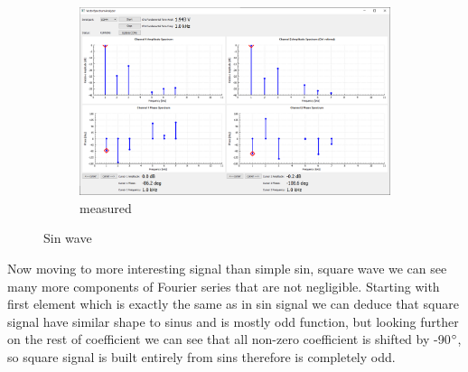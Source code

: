 \documentclass[notitlepage, a4paper, 11pt]{article}
\begin{document}
\begin{figure}[H]
\begin{subfigure}[][][t]{0.3\textwidth}
			\includegraphics[width=\textwidth, trim=10 80 555 100, clip]{../img/Circuit1/sin}
			\caption{measured}
			\label{fig:meas-signal-a}
		\end{subfigure}
		\caption{Sin wave}
		\label{fig:pure-sin}
	\end{figure}
	
	Now moving to more interesting signal than simple sin, square wave we can see many more components of Fourier series that are not negligible. Starting with first element which is exactly the same as in sin signal we can deduce that square signal have similar shape to sinus and is mostly odd function, but looking further on the rest of coefficient we can see that all non-zero coefficient is shifted by -90$\degree$, so square signal is built entirely from sins therefore is completely odd.
	
\end{document}
